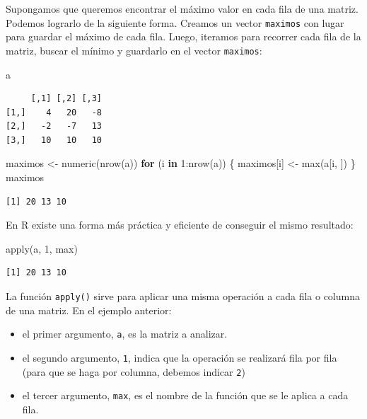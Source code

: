\documentclass[
]{book}
\newenvironment{Shaded}{\begin{snugshade}}{\end{snugshade}}
\newcommand{\ControlFlowTok}[1]{\textcolor[rgb]{0.13,0.29,0.53}{\textbf{#1}}}
\newcommand{\DecValTok}[1]{\textcolor[rgb]{0.00,0.00,0.81}{#1}}
\newcommand{\FunctionTok}[1]{\textcolor[rgb]{0.00,0.00,0.00}{#1}}
\newcommand{\NormalTok}[1]{#1}
\newcommand{\OtherTok}[1]{\textcolor[rgb]{0.56,0.35,0.01}{#1}}
\newcommand{\SpecialCharTok}[1]{\textcolor[rgb]{0.00,0.00,0.00}{#1}}
\providecommand{\tightlist}{%
  \setlength{\itemsep}{0pt}\setlength{\parskip}{0pt}}
\begin{document}
Supongamos que queremos encontrar el máximo valor en cada fila de una matriz. Podemos lograrlo de la siguiente forma. Creamos un vector \texttt{maximos} con lugar para guardar el máximo de cada fila. Luego, iteramos para recorrer cada fila de la matriz, buscar el mínimo y guardarlo en el vector \texttt{maximos}:

\begin{Shaded}
\begin{Highlighting}[]
\NormalTok{a}
\end{Highlighting}
\end{Shaded}

\begin{verbatim}
     [,1] [,2] [,3]
[1,]    4   20   -8
[2,]   -2   -7   13
[3,]   10   10   10
\end{verbatim}

\begin{Shaded}
\begin{Highlighting}[]
\NormalTok{maximos }\OtherTok{\textless{}{-}} \FunctionTok{numeric}\NormalTok{(}\FunctionTok{nrow}\NormalTok{(a))}
\ControlFlowTok{for}\NormalTok{ (i }\ControlFlowTok{in} \DecValTok{1}\SpecialCharTok{:}\FunctionTok{nrow}\NormalTok{(a)) \{}
\NormalTok{    maximos[i] }\OtherTok{\textless{}{-}} \FunctionTok{max}\NormalTok{(a[i, ])}
\NormalTok{\}}
\NormalTok{maximos}
\end{Highlighting}
\end{Shaded}

\begin{verbatim}
[1] 20 13 10
\end{verbatim}

En R existe una forma más práctica y eficiente de conseguir el mismo resultado:

\begin{Shaded}
\begin{Highlighting}[]
\FunctionTok{apply}\NormalTok{(a, }\DecValTok{1}\NormalTok{, max)}
\end{Highlighting}
\end{Shaded}

\begin{verbatim}
[1] 20 13 10
\end{verbatim}

La función \texttt{apply()} sirve para aplicar una misma operación a cada fila o columna de una matriz. En el ejemplo anterior:

\begin{itemize}
\tightlist
\item
  el primer argumento, \texttt{a}, es la matriz a analizar.
\item
  el segundo argumento, \texttt{1}, indica que la operación se realizará fila por fila (para que se haga por columna, debemos indicar \texttt{2})
\item
  el tercer argumento, \texttt{max}, es el nombre de la función que se le aplica a cada fila.
\end{itemize}
\end{document}
